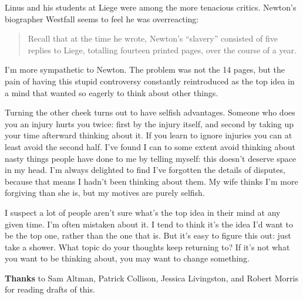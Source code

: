 Linus and his students at Liege were among the more tenacious critics.
Newton's biographer Westfall seems to feel he was overreacting:

\begin{quote}
Recall that at the time he wrote, Newton's ``slavery'' consisted of five
replies to Liege, totalling fourteen printed pages, over the course of a
year.
\end{quote}

I'm more sympathetic to Newton. The problem was not the 14 pages, but
the pain of having this stupid controversy constantly reintroduced as
the top idea in a mind that wanted so eagerly to think about other
things.

Turning the other cheek turns out to have selfish advantages. Someone
who does you an injury hurts you twice: first by the injury itself, and
second by taking up your time afterward thinking about it. If you learn
to ignore injuries you can at least avoid the second half. I've found I
can to some extent avoid thinking about nasty things people have done to
me by telling myself: this doesn't deserve space in my head. I'm always
delighted to find I've forgotten the details of disputes, because that
means I hadn't been thinking about them. My wife thinks I'm more
forgiving than she is, but my motives are purely selfish.

I suspect a lot of people aren't sure what's the top idea in their mind
at any given time. I'm often mistaken about it. I tend to think it's the
idea I'd want to be the top one, rather than the one that is. But it's
easy to figure this out: just take a shower. What topic do your thoughts
keep returning to? If it's not what you want to be thinking about, you
may want to change something.


\textbf{Thanks} to Sam Altman, Patrick Collison, Jessica Livingston, and
Robert Morris for reading drafts of this.
